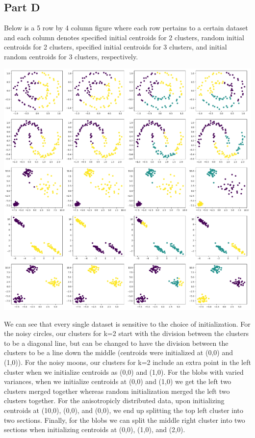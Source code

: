 \documentclass{article}
\begin{document}
\subsection*{Part D}
Below is a 5 row by 4 column figure where each row pertains to a certain dataset and each column denotes 
specified initial centroids for 2 clusters, random initial centroids for 2 clusters, specified initial 
centroids for 3 clusters, and initial random centroids for 3 clusters, respectively.

\includegraphics[width=\linewidth]{Images/Screenshot 2024-03-04 175453.png}

We can see that every single dataset is sensitive to the choice of initialization. For the noisy circles, 
our clusters for k=2 start with the division between the clusters to be a diagonal line, but can be changed 
to have the division between the clusters to be a line down the middle (centroids were initialized at 
(0,0) and (1,0)). For the noisy moons, our clusters for k=2 include an extra point in the left cluster 
when we initialize centroids as (0,0) and (1,0). For the blobs with varied variances, when we initialize 
centroids at (0,0) and (1,0) we get the left two clusters merged together whereas random initialization 
merged the left two clusters together. For the anisotropicly distributed data, upon initializing centroids 
at (10,0), (0,0), and (0,0), we end up splitting the top left cluster into two sections. Finally, for the 
blobs we can split the middle right cluster into two sections when initializing centroids at (0,0), (1,0), 
and (2,0).
\end{document}
